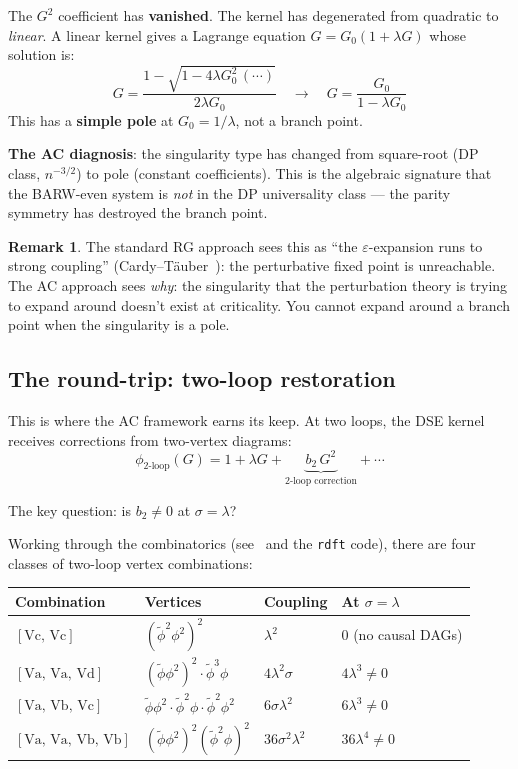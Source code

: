\documentclass[11pt,a4paper]{article}
\theoremstyle{definition}
\newtheorem*{remark}{Remark}
\newcommand{\phit}{\tilde{\phi}}
\begin{document}
The $G^2$ coefficient has \textbf{vanished}. The kernel has degenerated
from quadratic to \emph{linear}. A linear kernel gives a Lagrange
equation $G = G_0(1 + \lambda G)$ whose solution is:
\[
G = \frac{1 - \sqrt{1 - 4\lambda G_0^2\,(\cdots)}}{2\lambda G_0}
\quad\longrightarrow\quad
G = \frac{G_0}{1 - \lambda G_0}
\]
This has a \textbf{simple pole} at $G_0 = 1/\lambda$, not a branch point.

\textbf{The AC diagnosis}: the singularity type has changed from square-root
(DP class, $n^{-3/2}$) to pole (constant coefficients). This is the algebraic
signature that the BARW-even system is \emph{not} in the DP universality
class --- the parity symmetry has destroyed the branch point.

\begin{remark}
The standard RG approach sees this as ``the $\varepsilon$-expansion runs to
strong coupling'' (Cardy--T\"auber~\cite{cardytauber1996}): the perturbative
fixed point is unreachable. The AC approach sees \emph{why}: the singularity
that the perturbation theory is trying to expand around doesn't exist at
criticality. You cannot expand around a branch point when the singularity
is a pole.
\end{remark}

\subsection{The round-trip: two-loop restoration}

This is where the AC framework earns its keep. At two loops, the DSE
kernel receives corrections from two-vertex diagrams:
\begin{equation}
\phi_{\text{2-loop}}(G) = 1 + \lambda G + \underbrace{b_2\, G^2}_{\text{2-loop correction}}
+ \cdots
\end{equation}

The key question: is $b_2 \neq 0$ at $\sigma = \lambda$?

Working through the combinatorics (see~\cite{amarteifio2019} and the
\texttt{rdft} code), there are four classes of two-loop vertex
combinations:
\begin{center}
\renewcommand{\arraystretch}{1.2}
\begin{tabular}{llll}
\toprule
Combination & Vertices & Coupling & At $\sigma = \lambda$ \\
\midrule
$[\text{Vc, Vc}]$ & $(\phit^2\phi^2)^2$ & $\lambda^2$ & 0 (no causal DAGs) \\
$[\text{Va, Va, Vd}]$ & $(\phit\phi^2)^2 \cdot \phit^3\phi$ & $4\lambda^2\sigma$ & $4\lambda^3 \neq 0$ \\
$[\text{Va, Vb, Vc}]$ & $\phit\phi^2 \cdot \phit^2\phi \cdot \phit^2\phi^2$ & $6\sigma\lambda^2$ & $6\lambda^3 \neq 0$ \\
$[\text{Va, Va, Vb, Vb}]$ & $(\phit\phi^2)^2(\phit^2\phi)^2$ & $36\sigma^2\lambda^2$ & $36\lambda^4 \neq 0$ \\
\bottomrule
\end{tabular}
\end{center}
\end{document}

